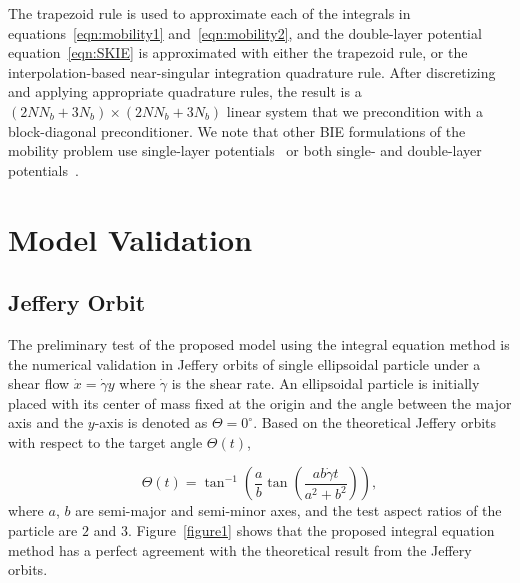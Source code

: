 \documentclass[lineno]{jfm}
\begin{document}
The trapezoid rule is used to approximate each of the integrals in
equations~\eqref{eqn:mobility1} and~\eqref{eqn:mobility2}, and the
double-layer potential equation~\eqref{eqn:SKIE} is approximated with
either the trapezoid rule, or the interpolation-based near-singular
integration quadrature rule. After discretizing and applying appropriate
quadrature rules, the result is a $(2NN_b + 3N_b) \times (2NN_b + 3N_b)$
linear system that we precondition with a block-diagonal preconditioner.
We note that other BIE formulations of the mobility problem use
single-layer potentials~\cite{cor-gre-rac-vee2017, rac-gre2016} or both
single- and double-layer potentials~\cite{cor-vee2018}.





\section{\label{validation}Model Validation}

\subsection{Jeffery Orbit}


The preliminary test of the proposed model using the integral equation method is the numerical validation in Jeffery orbits of single ellipsoidal particle under a shear flow $\dot x = \dot\gamma y$ where $\dot\gamma$ is the shear rate. An ellipsoidal particle is initially placed with its center of mass fixed at the origin and the angle between the major axis and the $y$-axis is denoted as $\Theta = 0^\circ$. Based on the theoretical Jeffery orbits with respect to the target angle $\Theta(t)$, 

\begin{equation}
\Theta(t) = \tan^{-1}\left(\frac{a}{b}\tan \left(\frac{ab \dot\gamma t}{a^2+b^2}\right)\right),
\end{equation}
%
where $a$, $b$ are semi-major and semi-minor axes, and the test aspect ratios of the particle are $2$ and $3$. Figure~\ref{figure1} shows that the proposed integral equation method has a perfect agreement with the theoretical result from the Jeffery orbits.
\end{document}
